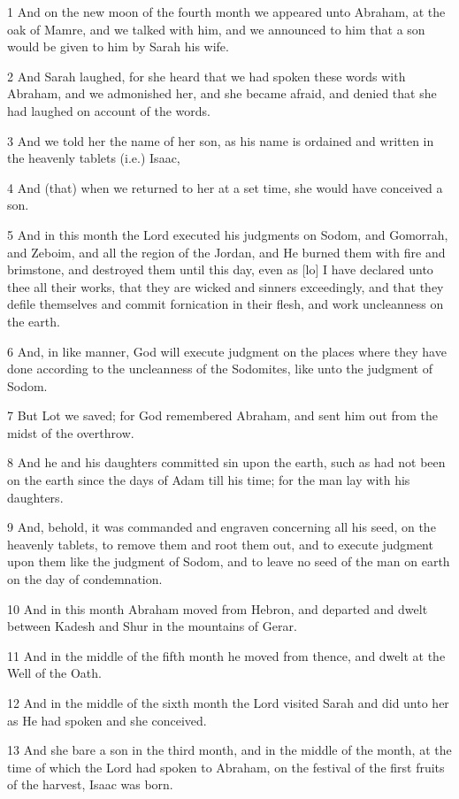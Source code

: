 \par 1 And on the new moon of the fourth month we appeared unto Abraham, at the oak of Mamre, and we talked with him, and we announced to him that a son would be given to him by Sarah his wife.
\par 2 And Sarah laughed, for she heard that we had spoken these words with Abraham, and we admonished her, and she became afraid, and denied that she had laughed on account of the words.
\par 3 And we told her the name of her son, as his name is ordained and written in the heavenly tablets (i.e.) Isaac,
\par 4 And (that) when we returned to her at a set time, she would have conceived a son.
\par 5 And in this month the Lord executed his judgments on Sodom, and Gomorrah, and Zeboim, and all the region of the Jordan, and He burned them with fire and brimstone, and destroyed them until this day, even as [lo] I have declared unto thee all their works, that they are wicked and sinners exceedingly, and that they defile themselves and commit fornication in their flesh, and work uncleanness on the earth.
\par 6 And, in like manner, God will execute judgment on the places where they have done according to the uncleanness of the Sodomites, like unto the judgment of Sodom.
\par 7 But Lot we saved; for God remembered Abraham, and sent him out from the midst of the overthrow.
\par 8 And he and his daughters committed sin upon the earth, such as had not been on the earth since the days of Adam till his time; for the man lay with his daughters.
\par 9 And, behold, it was commanded and engraven concerning all his seed, on the heavenly tablets, to remove them and root them out, and to execute judgment upon them like the judgment of Sodom, and to leave no seed of the man on earth on the day of condemnation.
\par 10 And in this month Abraham moved from Hebron, and departed and dwelt between Kadesh and Shur in the mountains of Gerar.
\par 11 And in the middle of the fifth month he moved from thence, and dwelt at the Well of the Oath.
\par 12 And in the middle of the sixth month the Lord visited Sarah and did unto her as He had spoken and she conceived.
\par 13 And she bare a son in the third month, and in the middle of the month, at the time of which the Lord had spoken to Abraham, on the festival of the first fruits of the harvest, Isaac was born.
